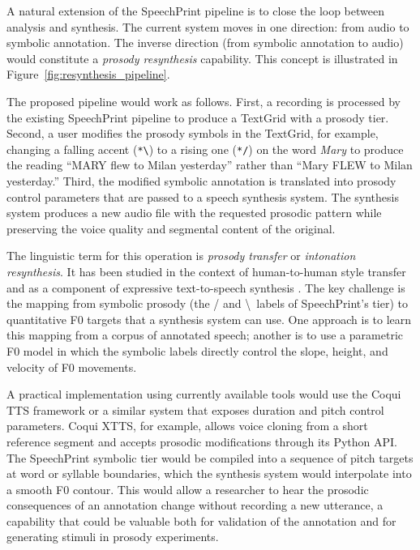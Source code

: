 A natural extension of the SpeechPrint pipeline is to close the loop between
analysis and synthesis. The current system moves in one direction: from audio
to symbolic annotation. The inverse direction (from symbolic annotation to
audio) would constitute a \emph{prosody resynthesis} capability. This concept
is illustrated in Figure~\ref{fig:resynthesis_pipeline}.

The proposed pipeline would work as follows. First, a recording is processed by
the existing SpeechPrint pipeline to produce a TextGrid with a prosody tier.
Second, a user modifies the prosody symbols in the TextGrid, for example,
changing a falling accent (\texttt{*\textbackslash}) to a rising one
(\texttt{*/}) on the word \textit{Mary} to produce the reading ``MARY flew to
Milan yesterday'' rather than ``Mary FLEW to Milan yesterday.'' Third, the
modified symbolic annotation is translated into prosody control parameters that
are passed to a speech synthesis system. The synthesis system produces a new
audio file with the requested prosodic pattern while preserving the voice quality
and segmental content of the original.

The linguistic term for this operation is \emph{prosody transfer} or
\emph{intonation resynthesis}. It has been studied in the context of
human-to-human style transfer and as a component of expressive text-to-speech
synthesis \cite{skerry2018towards}. The key challenge is the mapping from
symbolic prosody (the / and \textbackslash\ labels of SpeechPrint's tier) to
quantitative F0 targets that a synthesis system can use. One approach is to
learn this mapping from a corpus of annotated speech; another is to use a
parametric F0 model in which the symbolic labels directly control the slope,
height, and velocity of F0 movements.

A practical implementation using currently available tools would use the
Coqui TTS framework or a similar system that exposes duration and pitch control
parameters. Coqui XTTS, for example, allows voice cloning from a short reference
segment and accepts prosodic modifications through its Python API. The SpeechPrint
symbolic tier would be compiled into a sequence of pitch targets at word or
syllable boundaries, which the synthesis system would interpolate into a smooth
F0 contour. This would allow a researcher to hear the prosodic consequences of an
annotation change without recording a new utterance, a capability that could be
valuable both for validation of the annotation and for generating stimuli in
prosody experiments.

